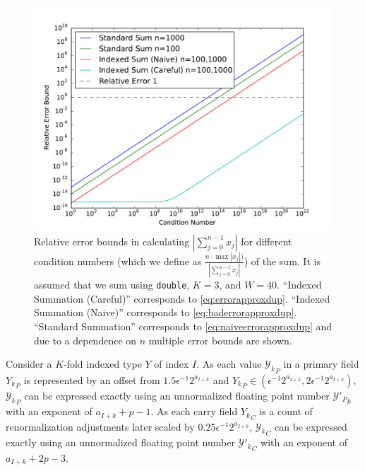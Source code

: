 \begin{figure}[H]
\begin{center}
\includegraphics[width=\textwidth]{plots/errorcomparison.pdf}
\caption{Relative error bounds in calculating $|\sum \limits_{j = 0}^{n - 1} x_j|$ for different condition numbers (which we define as $\frac{n \cdot \max |x_j|)}{|\sum \limits_{j = 0}^{n - 1} x_j|}$) of the sum. It is assumed that we sum using \texttt{double}, $K = 3$, and $W = 40$. ``Indexed Summation (Careful)'' corresponds to \eqref{eq:errorapproxdup}. ``Indexed Summation (Naive)'' corresponds to \eqref{eq:baderrorapproxdup}. ``Standard Summation'' corresponds to \eqref{eq:naiveerrorapproxdup} and due to a dependence on $n$ multiple error bounds are shown.}
\label{fig:conversionmotivation}
\end{center}
\end{figure}

    Consider a $K$-fold indexed type $Y$ of index $I$.
    As each value ${\mathcal{Y}_k}_P$ in a primary field ${Y_k}_P$ is represented by an offset from $1.5  \epsilon^{-1}  2^{a_{I + k}}$ and ${Y_k}_P \in (\epsilon^{-1}  2^{a_{I + k}}, 2  \epsilon^{-1}  2^{a_{I + k}})$, ${\mathcal{Y}_k}_P$ can be expressed exactly using an unnormalized floating point number ${\mathcal{Y}'_P}_k$ with an exponent of $a_{I + k} + p - 1$.
    As each carry field ${Y_k}_C$ is a count of renormalization adjustments later scaled by $0.25  \epsilon^{-1}  2^{a_{I + k}}$, ${\mathcal{Y}_k}_C$ can be expressed exactly using an unnormalized floating point number ${\mathcal{Y}'_k}_C$ with an exponent of $a_{I + k} + 2  p - 3$.

